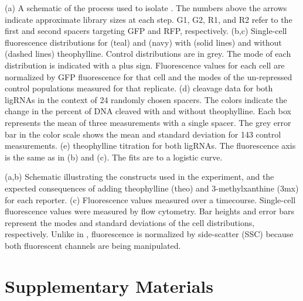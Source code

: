 \documentclass[10pt,oneside]{article}
\begin{document}
 (a) A schematic of the process used to isolate \ligrnaF{}.  The numbers above the arrows indicate approximate library sizes at each step.  G1, G2, R1, and R2 refer to the first and second spacers targeting GFP and RFP, respectively.
 (b,c) Single-cell fluorescence distributions for \ligrnaF{} (teal) and \ligrnaB{} (navy) with (solid lines) and without (dashed lines) theophylline.  Control distributions are in grey.  The mode of each distribution is indicated with a plus sign.  Fluorescence values for each cell are normalized by GFP fluorescence for that cell and the modes of the un-repressed control populations measured for that replicate.
 (d) \Invitro{} cleavage data for both ligRNAs in the context of 24 randomly chosen spacers.  The colors indicate the change in the percent of DNA cleaved with and without theophylline.  Each box represents the mean of three measurements with a single spacer.   The grey error bar in the color scale shows the mean and standard deviation for 143 control measurements.
 (e) \Invivo{} theophylline titration for both ligRNAs.  The fluorescence axis is the same as in (b) and (c).  The fits are to a logistic curve.
 



 (a,b) Schematic illustrating the constructs used in the experiment, and the expected consequences of adding theophylline (theo) and 3-methylxanthine (3mx) for each reporter.
 (c) Fluorescence values measured over a  timecourse.  Single-cell fluorescence values were measured by flow cytometry.  Bar heights and error bars represent the modes and standard deviations of the cell distributions, respectively.  Unlike in , fluorescence is normalized by side-scatter (SSC) because both fluorescent channels are being manipulated.

\section{Supplementary Materials}





\end{document}
